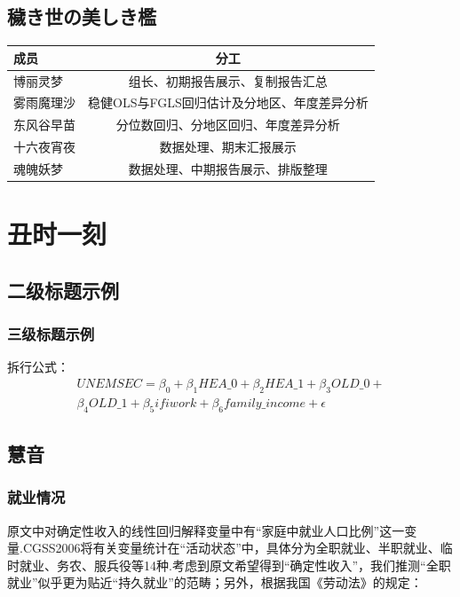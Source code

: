 \documentclass[a4paper,12pt]{report}
\begin{document}
\section{穢き世の美しき檻}
\begin{table}[h]
    \centering
    \begin{tabular}{lc}
        \toprule[1.5pt]
        成员       & 分工                                        \\
        \midrule[1.0pt]
        博丽灵梦   & 组长、初期报告展示、复制报告汇总            \\
        雾雨魔理沙 & 稳健OLS与FGLS回归估计及分地区、年度差异分析 \\
        东风谷早苗 & 分位数回归、分地区回归、年度差异分析        \\
        十六夜宵夜 & 数据处理、期末汇报展示                      \\
        魂魄妖梦   & 数据处理、中期报告展示、排版整理            \\
        \bottomrule[1.5pt]
    \end{tabular}
\end{table}

\chapter{丑时一刻}
\section{二级标题示例}
\subsection{三级标题示例}
拆行公式：
\begin{equation}
    \begin{split}
        UNEMSEC = \beta_0 + \beta_1HEA\_0 + \beta_2HEA\_1 + \beta_3OLD\_0 +  \\
        \beta_4OLD\_1 + \beta_5ifiwork + \beta_6family\_income + \epsilon
    \end{split}
\end{equation}

\lipsum[1]

\section{慧音}
\subsection{就业情况}
原文中对确定性收入的线性回归解释变量中有“家庭中就业人口比例”这一变量.CGSS2006将有关变量统计在“活动状态”中，具体分为全职就业、半职就业、临时就业、务农、服兵役等14种.考虑到原文希望得到“确定性收入”，我们推测“全职就业”似乎更为贴近“持久就业”的范畴；另外，根据我国《劳动法》的规定：
\begin{quotation}
    \lipsum[1]
\end{quotation}
\end{document}
